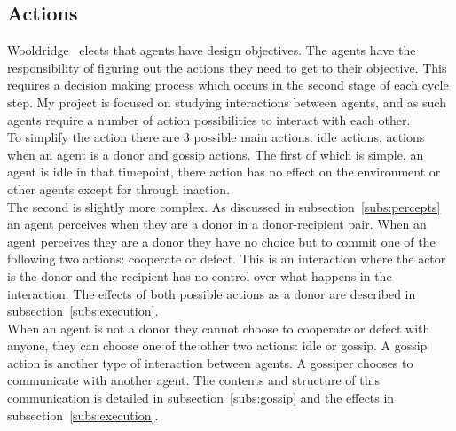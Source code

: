 \documentclass[]{final_report}
\begin{document}
\subsection{Actions}
\label{subs:actions}
Wooldridge~\cite{wooldridge2009introduction} elects that agents have design objectives. The agents have the responsibility of figuring out the actions they need to get to their objective. This requires a decision making process which occurs in the second stage of each cycle step. My project is focused on studying interactions between agents, and as such agents require a number of action possibilities to interact with each other.\\
To simplify the action there are 3 possible main actions: idle actions, actions when an agent is a donor and gossip actions. The first of which is simple, an agent is idle in that timepoint, there action has no effect on the environment or other agents except for through inaction.\\
The second is slightly more complex. As discussed in subsection~\ref{subs:percepts} an agent perceives when they are a donor in a donor-recipient pair. When an agent perceives they are a donor they have no choice but to commit one of the following two actions: cooperate or defect. This is an interaction where the actor is the donor and the recipient has no control over what happens in the interaction. The effects of both possible actions as a donor are described in subsection~\ref{subs:execution}.\\
When an agent is not a donor they cannot choose to cooperate or defect with anyone, they can choose one of the other two actions: idle or gossip. A gossip action is another type of interaction between agents. A gossiper chooses to communicate with another agent. The contents and structure of this communication is detailed in subsection~\ref{subs:gossip} and the effects in subsection~\ref{subs:execution}.
\end{document}
